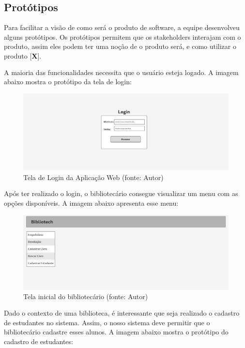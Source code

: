 \subsection[Protótipos]{Protótipos}
Para facilitar a visão de como será o produto de software, a equipe desenvolveu alguns protótipos. Os protótipos permitem que os stakeholders interajam com o produto, assim eles podem ter uma noção de o produto será, e como utilizar o produto [\textbf{X}]. 

A maioria das funcionalidades necessita que o usuário esteja logado. A imagem abaixo mostra o protótipo da tela de login: 

\begin{figure}[!h]
\centering
\includegraphics[scale=0.40, angle = 360]{figuras/prototipo1}
\caption[]{Tela de Login da Aplicação Web (fonte: Autor)}
\end{figure}
\FloatBarrier

Após ter realizado o login, o bibliotecário consegue visualizar um menu com as opções disponíveis. A imagem abaixo apresenta esse menu:

\begin{figure}[!h]
\centering
\includegraphics[scale=0.40, angle = 360]{figuras/prototipo2}
\caption[]{Tela inicial do bibliotecário (fonte: Autor)}
\end{figure}
\FloatBarrier

Dado o contexto de uma biblioteca, é interessante que seja realizado o cadastro de estudantes no sistema. Assim, o nosso sistema deve permitir que o bibliotecário cadastre esses alunos. A imagem abaixo mostra o protótipo do cadastro de estudantes:

